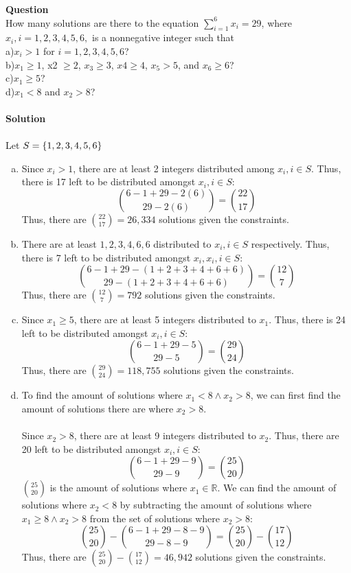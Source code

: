 \documentclass[article, 11pt]{article}
\newcounter{question}
\def\questionnum{{\Large\bfseries{Question \arabic{question} }}\\[1em]}
\newcommand{\question}{
    \stepcounter{question}
    \questionnum
}
\newcommand{\solution}{
    {{\large\bfseries{Solution}}}
}
\DeclarePairedDelimiter\set{\{}{\}}
\newcommand{\reals}{\mathbb{R}} %
\begin{document}
\newpage
\question
How many solutions are there to the equation $\sum_{i=1}^6 x_i=29$, where $x_i, i = 1, 2, 3, 4, 5, 6,$ is a nonnegative integer such that\\ a)$x_i > 1$ for $i = 1, 2, 3, 4, 5, 6$?\\ b)$x_1 \geq 1$, x2 $\geq 2$, $x_3 \geq 3$, $x4 \geq 4$, $x_5 > 5$, and $x_6 \geq 6$?\\ c)$x_1 \geq 5$? \\ d)$x_1 < 8$ and $x_2 > 8$? \\
\\
\solution \\
\\
Let $S=\set*{1,2,3,4,5,6}$
\begin{enumerate}[a)]
    \item 
    Since $x_i > 1$, there are at least 2 integers distributed among $x_i, i \in S$. Thus, there is 17 left to be distributed amongst $x_i, i \in S$:
    \[ \binom{6-1+29-2(6)}{29-2(6)} = \binom{22}{17} \]
    Thus, there are $\binom{22}{17} = 26,334$ solutions given the constraints.
    \item 
    There are at least $1,2,3,4,6,6$ distributed to $x_i, i \in S$ respectively. Thus, there is 7 left to be distributed amongst $x_i, x_i, i \in S$:
    \[ \binom{6-1+29-(1+2+3+4+6+6)}{29-(1+2+3+4+6+6)} = \binom{12}{7} \]
    Thus, there are $\binom{12}{7} = 792$ solutions given the constraints.
    \item
    Since $x_1 \geq 5$, there are at least 5 integers distributed to $x_1$. Thus, there is 24 left to be distributed amongst $x_i, i \in S$: 
    \[ \binom{6-1+29-5}{29-5} = \binom{29}{24} \]    
    Thus, there are $\binom{29}{24} = 118,755$ solutions given the constraints.
    \item 
    To find the amount of solutions where $x_1 < 8 \land x_2 > 8$, we can first find the amount of solutions there are where $x_2 > 8$. \\
    \\
    Since $x_2 > 8$, there are at least 9 integers distributed to $x_2$. Thus, there are 20 left to be distributed amongst $x_i, i \in S$:
    \[ \binom{6-1+29-9}{29-9} = \binom{25}{20} \]
    $\displaystyle\binom{25}{20}$ is the amount of solutions where $x_1 \in \reals$. We can find the amount of solutions where $x_2 < 8$ by subtracting the amount of solutions where $x_1 \geq 8 \land x_2 > 8$ from the set of solutions where $x_2 > 8$:
    \[ \binom{25}{20} - \binom{6 - 1 + 29 - 8 - 9}{29 - 8 - 9} = \binom{25}{20} - \binom{17}{12} \]
    Thus, there are $\binom{25}{20} - \binom{17}{12} = 46,942$ solutions given the constraints.
\end{enumerate}
\end{document}
